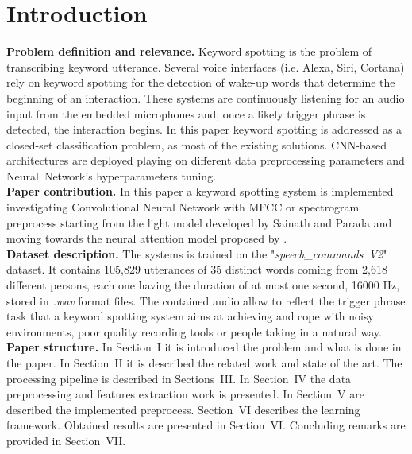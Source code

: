 
\section{Introduction}
\label{sec:introduction}
\noindent \textbf{Problem definition and relevance.} Keyword spotting is the problem of transcribing keyword utterance. Several voice interfaces (i.e. Alexa, Siri, Cortana) rely on keyword spotting for the detection of wake-up words that determine the beginning of an interaction. These systems are continuously listening for an audio input from the embedded microphones and, once a likely trigger phrase is detected, the interaction begins. 
In this paper keyword spotting is addressed as a closed-set classification problem, as most of the existing solutions. CNN-based architectures are deployed playing on different data preprocessing parameters and \mbox{Neural Network's} hyperparameters tuning.\\

\noindent \textbf{Paper contribution.} In this paper a keyword spotting system is implemented investigating Convolutional Neural Network with MFCC or spectrogram preprocess starting from the light model developed by Sainath and Parada \cite{sainath2015convolutional} and moving towards the neural attention model proposed by \cite{de2018neural}. \\

\noindent \textbf{Dataset description.} \cite{Warden-2018} The systems is trained on the \mbox{"{\it speech\_commands V2}"} dataset. It contains 105,829 utterances of 35 distinct words coming from 2,618 different persons, each one having the duration of at most one second, 16000 Hz, stored in {\it .wav} format files. The contained audio allow to reflect the trigger phrase task that a keyword spotting system aims at achieving and cope with noisy environments, poor quality recording tools or people taking in a natural way. \\ 

\noindent \textbf{Paper structure.} In Section~I it is introduced the problem and what is done in the paper. In Section~II it is described the related work and state of the art. The processing pipeline is described in Sections~III. In Section~IV the data preprocessing and features extraction work is presented. In Section~V are described the implemented preprocess. Section~VI describes the learning framework. Obtained results are presented in Section~VI.  Concluding remarks are provided in Section~VII.

